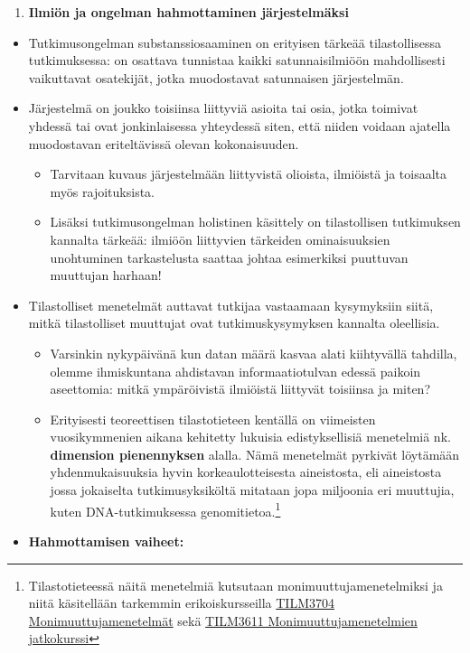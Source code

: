 \documentclass[
]{book}
\providecommand{\tightlist}{%
  \setlength{\itemsep}{0pt}\setlength{\parskip}{0pt}}
\begin{document}
\begin{enumerate}
\def\labelenumi{\arabic{enumi}.}
\setcounter{enumi}{1}
\tightlist
\item
  \textbf{Ilmiön ja ongelman hahmottaminen järjestelmäksi}
\end{enumerate}

\begin{itemize}
\tightlist
\item
  Tutkimusongelman substanssiosaaminen on erityisen tärkeää tilastollisessa tutkimuksessa: on osattava tunnistaa kaikki satunnaisilmiöön mahdollisesti vaikuttavat osatekijät, jotka muodostavat satunnaisen järjestelmän.
\item
  Järjestelmä on joukko toisiinsa liittyviä asioita tai osia, jotka toimivat yhdessä tai ovat
  jonkinlaisessa yhteydessä siten, että niiden voidaan ajatella muodostavan eriteltävissä olevan kokonaisuuden.

  \begin{itemize}
  \tightlist
  \item
    Tarvitaan kuvaus järjestelmään liittyvistä olioista, ilmiöistä ja toisaalta myös rajoituksista.
  \item
    Lisäksi tutkimusongelman holistinen käsittely on tilastollisen tutkimuksen kannalta tärkeää: ilmiöön liittyvien tärkeiden ominaisuuksien unohtuminen tarkastelusta saattaa johtaa esimerkiksi puuttuvan muuttujan harhaan!
  \end{itemize}
\item
  Tilastolliset menetelmät auttavat tutkijaa vastaamaan kysymyksiin siitä, mitkä tilastolliset muuttujat ovat tutkimuskysymyksen kannalta oleellisia.

  \begin{itemize}
  \tightlist
  \item
    Varsinkin nykypäivänä kun datan määrä kasvaa alati kiihtyvällä tahdilla, olemme ihmiskuntana ahdistavan informaatiotulvan edessä paikoin aseettomia: mitkä ympäröivistä ilmiöistä liittyvät toisiinsa ja miten?
  \item
    Erityisesti teoreettisen tilastotieteen kentällä on viimeisten vuosikymmenien aikana kehitetty lukuisia edistyksellisiä menetelmiä nk. \textbf{dimension pienennyksen} alalla. Nämä menetelmät pyrkivät löytämään yhdenmukaisuuksia hyvin korkeaulotteisesta aineistosta, eli aineistosta jossa jokaiselta tutkimusyksiköltä mitataan jopa miljoonia eri muuttujia, kuten DNA-tutkimuksessa genomitietoa.\footnote{Tilastotieteessä näitä menetelmiä kutsutaan monimuuttujamenetelmiksi ja niitä käsitellään tarkemmin erikoiskursseilla \href{https://opas.peppi.utu.fi/fi/opintojakso/TILM3704/90801?period=2024-2027}{TILM3704 Monimuuttujamenetelmät} sekä \href{https://opas.peppi.utu.fi/fi/opintojakso/TILM3611/91182?period=2024-2027}{TILM3611 Monimuuttujamenetelmien jatkokurssi}}
  \end{itemize}
\item
  \textbf{Hahmottamisen vaiheet:}


\end{itemize}
\end{document}
